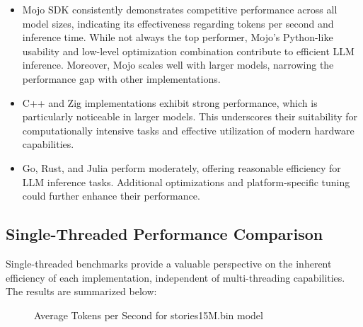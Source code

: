 \documentclass[sigconf]{acmart}
\begin{document}
\begin{itemize}

\item	Mojo SDK consistently demonstrates competitive performance across all model sizes, indicating its effectiveness regarding tokens per second and inference time. While not always the top performer, Mojo's Python-like usability and low-level optimization combination contribute to efficient LLM inference. Moreover, Mojo scales well with larger models, narrowing the performance gap with other implementations.

\item C++ and Zig implementations exhibit strong performance, which is particularly noticeable in larger models. This underscores their suitability for computationally intensive tasks and effective utilization of modern hardware capabilities.

\item	Go, Rust, and Julia perform moderately, offering reasonable efficiency for LLM inference tasks. Additional optimizations and platform-specific tuning could further enhance their performance.

\end{itemize}

\subsection{Single-Threaded Performance Comparison}
Single-threaded benchmarks provide a valuable perspective on the inherent efficiency of each implementation, independent of multi-threading capabilities. The results are summarized below:

\begin{figure}[htbp]
  \centering
  \caption{Average Tokens per Second for stories15M.bin model}
\end{figure}
\end{document}
